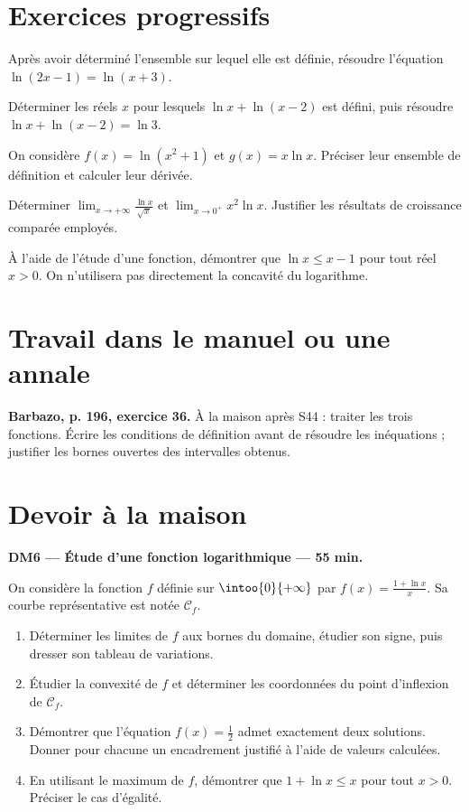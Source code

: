 \mxnewpage
\section{Exercices progressifs}

Après avoir déterminé l'ensemble sur lequel elle est définie, résoudre l'équation $\ln(2x-1)=\ln(x+3)$.

Déterminer les réels $x$ pour lesquels $\ln x+\ln(x-2)$ est défini, puis résoudre $\ln x+\ln(x-2)=\ln3$.

On considère $f(x)=\ln(x^2+1)$ et $g(x)=x\ln x$. Préciser leur ensemble de définition et calculer leur dérivée.

Déterminer $\displaystyle\lim_{x\to+\infty}\frac{\ln x}{\sqrt x}$ et $\displaystyle\lim_{x\to0^+}x^2\ln x$. Justifier les résultats de croissance comparée employés.

À l'aide de l'étude d'une fonction, démontrer que $\ln x\le x-1$ pour tout réel $x>0$. On n'utilisera pas directement la concavité du logarithme.

\section{Travail dans le manuel ou une annale}\textbf{Barbazo, p. 196, exercice 36.} À la maison après S44 : traiter les trois fonctions. Écrire les conditions de définition avant de résoudre les inéquations ; justifier les bornes ouvertes des intervalles obtenus.

\mxnewpage
\section{Devoir à la maison}\textbf{DM6 --- Étude d'une fonction logarithmique --- 55 min.}\par On considère la fonction $f$ définie sur $\intoo{0}{+\infty}$ par $f(x)=\frac{1+\ln x}{x}$. Sa courbe représentative est notée $\mathcal C_f$.
\begin{enumerate}\item Déterminer les limites de $f$ aux bornes du domaine, étudier son signe, puis dresser son tableau de variations.
\item Étudier la convexité de $f$ et déterminer les coordonnées du point d'inflexion de $\mathcal C_f$.
\item Démontrer que l'équation $f(x)=\frac12$ admet exactement deux solutions. Donner pour chacune un encadrement justifié à l'aide de valeurs calculées.
\item En utilisant le maximum de $f$, démontrer que $1+\ln x\le x$ pour tout $x>0$. Préciser le cas d'égalité.\end{enumerate}

